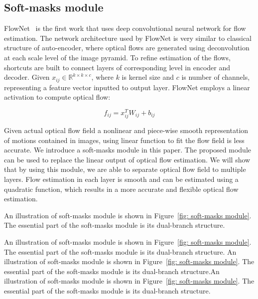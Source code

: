 \documentclass[10pt,twocolumn,letterpaper]{article}
\begin{document}
\subsection{Soft-masks module}
FlowNet~\cite{7410673} is the first work that uses deep convolutional neural network for flow estimation. The network architecture used by FlowNet is very similar to classical structure of auto-encoder, where optical flows are generated using deconvolution at each scale level of the image pyramid. To refine estimation of the flows, shortcuts are built to connect layers of corresponding level in encoder and decoder. Given $x_{ij}\in \mathbb{R}^{k\times k \times c}$, where $k$ is kernel size and $c$ is number of channels, representing a feature vector inputted to output layer. FlowNet employs a linear activation to compute optical flow:

\begin{equation}
f_{ij} = x^T_{ij} W_{ij} + b_{ij}  
\end{equation}

Given actual optical flow field a nonlinear and piece-wise smooth representation of motions contained in images, using linear function to fit the flow field is less accurate. We introduce a soft-masks module in this paper. The proposed module can be used to replace the linear output of optical flow estimation. We will show that by using this module, we are able to separate optical flow field to multiple layers. Flow estimation in each layer is smooth and can be estimated using a quadratic function, which results in a more accurate and flexible optical flow estimation. 

An illustration of soft-masks module is shown in Figure~\ref{fig: soft-masks module}. The essential part of the soft-masks module is its dual-branch structure.

An illustration of soft-masks module is shown in Figure~\ref{fig: soft-masks module}. The essential part of the soft-masks module is its dual-branch structure.
An illustration of soft-masks module is shown in Figure~\ref{fig: soft-masks module}. The essential part of the soft-masks module is its dual-branch structure.An illustration of soft-masks module is shown in Figure~\ref{fig: soft-masks module}. The essential part of the soft-masks module is its dual-branch structure.
\end{document}
